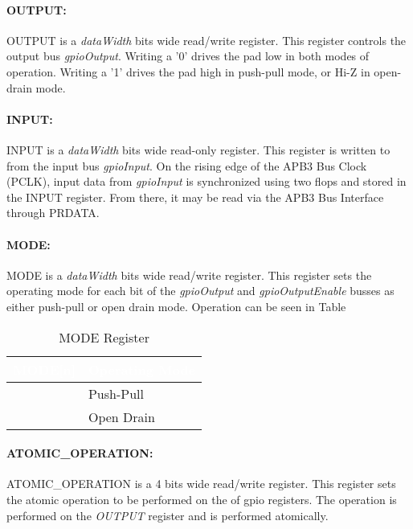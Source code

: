 \paragraph{OUTPUT:}
OUTPUT is a \textit{dataWidth} bits wide read/write register. This register controls the 
output bus \textit{gpioOutput}. Writing a '0' drives the pad low in both modes of operation. Writing a '1' 
drives the pad high in push-pull mode, or Hi-Z in open-drain mode. 

\paragraph{INPUT:}
INPUT is a \textit{dataWidth} bits wide read-only register. This register is written to from the 
input bus \textit{gpioInput}. On the rising edge of the APB3 Bus Clock (PCLK), input data from \textit{gpioInput} 
is synchronized using two flops and stored in the INPUT register. From there, it may be read via the APB3 Bus Interface
through PRDATA. 

\paragraph{MODE:}
MODE is a \textit{dataWidth} bits wide read/write register. This register sets the operating mode for each bit
of the \textit{gpioOutput} and \textit{gpioOutputEnable} busses as either push-pull or open drain mode. Operation can be seen in Table
\begin{table}[h]
  \begin{center}
  \begin{tabularx}{0.5\textwidth}{|>{\centering\arraybackslash}c|>{\centering\arraybackslash}X|}
      \hline
      \rowcolor{dark-gray}  %
      \textcolor{white}{\textbf{MODE[n]}} & \textcolor{white}{\textbf{Operating Mode}} \\ \hline
      0 & Push-Pull \\ \hline
      1 & Open Drain\\ \hline
\end{tabularx}
\caption{MODE Register}

\end{center}
\end{table}

% 
\paragraph{ATOMIC\_OPERATION:}
ATOMIC\_OPERATION is a 4 bits wide read/write register. This register sets the atomic operation to be performed on the
of gpio registers. The operation is performed on the \textit{OUTPUT} register and is performed atomically.

